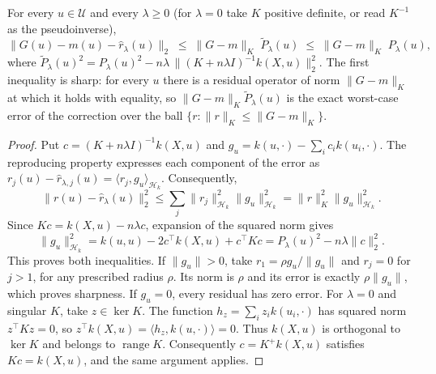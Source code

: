 \begin{theorem}\label{thm:or}
For every $u\in\mathcal U$ and every $\lambda\ge0$ (for $\lambda=0$ take $K$
positive definite, or read $K^{-1}$ as the pseudoinverse),
\[
\big\|G(u)-m(u)-\widehat r_\lambda(u)\big\|_2\;\le\;\|G-m\|_K\;
\widetilde P_\lambda(u)\;\le\;\|G-m\|_K\;P_\lambda(u),
\]
where
$\widetilde P_\lambda(u)^2=P_\lambda(u)^2-n\lambda\,\|(K+n\lambda
I)^{-1}k(X,u)\|_2^2$. The first inequality is sharp: for every $u$ there is
a residual operator of norm $\|G-m\|_K$ at which it holds with equality, so
$\|G-m\|_K\widetilde P_\lambda(u)$ is the exact worst-case error of the correction
over the ball $\{r:\|r\|_K\le\|G-m\|_K\}$.
\end{theorem}
\begin{proof}
Put $c=(K+n\lambda I)^{-1}k(X,u)$ and
$g_u=k(u,\cdot)-\sum_i c_i k(u_i,\cdot)$.
The reproducing property expresses each component of the error as
$r_j(u)-\widehat r_{\lambda,j}(u)=\langle r_j,g_u\rangle_{\mathcal H_k}$.
Consequently,
\[
\|r(u)-\widehat r_\lambda(u)\|_2^2
\le\sum_j\|r_j\|_{\mathcal H_k}^2\|g_u\|_{\mathcal H_k}^2
=\|r\|_K^2\|g_u\|_{\mathcal H_k}^2.
\]
Since $Kc=k(X,u)-n\lambda c$, expansion of the squared norm gives
\[
\|g_u\|_{\mathcal H_k}^2
=k(u,u)-2c^\top k(X,u)+c^\top Kc
=P_\lambda(u)^2-n\lambda\|c\|_2^2.
\]
This proves both inequalities. If $\|g_u\|>0$, take
$r_1=\rho g_u/\|g_u\|$ and $r_j=0$ for $j>1$, for any prescribed
radius $\rho$. Its norm is $\rho$ and its error is exactly $\rho\|g_u\|$,
which proves sharpness. If $g_u=0$, every residual has zero error.
For $\lambda=0$ and singular $K$, take $z\in\ker K$. The function
$h_z=\sum_i z_i k(u_i,\cdot)$ has squared norm $z^\top Kz=0$, so
$z^\top k(X,u)=\langle h_z,k(u,\cdot)\rangle=0$.
Thus $k(X,u)$ is orthogonal to $\ker K$ and belongs to
$\operatorname{range}K$. Consequently $c=K^+k(X,u)$ satisfies
$Kc=k(X,u)$, and the same argument applies.
\end{proof}


